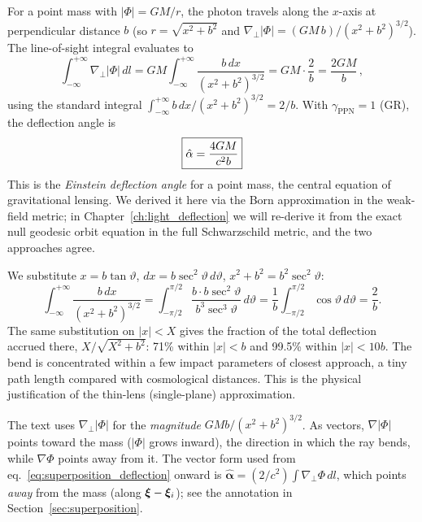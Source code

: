 For a point mass with $|\Phi| = GM/r$, the photon travels along the
$x$-axis at perpendicular distance $b$ (so
$r = \sqrt{x^2 + b^2}$ and
$\nabla_\perp |\Phi| = (GM\, b)/(x^2 + b^2)^{3/2}$).
The line-of-sight integral evaluates to
\begin{equation}
    \int_{-\infty}^{+\infty} \nabla_\perp |\Phi|\, dl
    = GM \int_{-\infty}^{+\infty}
    \frac{b\, dx}{(x^2 + b^2)^{3/2}}
    = GM \cdot \frac{2}{b}
    = \frac{2GM}{b} \,,
    \label{eq:deflection_integral_eval}
\end{equation}
using the standard integral
$\int_{-\infty}^{+\infty} b\, dx/(x^2 + b^2)^{3/2} = 2/b$.
With $\gamma_{\mathrm{PPN}} = 1$ (GR), the deflection angle is
\begin{equation}
    \boxed{
    \hat{\alpha} = \frac{4GM}{c^2 b}
    }
    \label{eq:deflection_point_mass}
\end{equation}
This is the \emph{Einstein deflection angle} for a point mass,
the central equation of gravitational lensing.  We derived
it here via the Born approximation in the weak-field metric; in
Chapter~\ref{ch:light_deflection} we will re-derive it from the exact null
geodesic orbit equation in the full Schwarzschild metric, and the two
approaches agree.

\begin{derivation}
We substitute $x = b\tan\vartheta$, $dx = b\sec^2\vartheta\,d\vartheta$,
$x^2 + b^2 = b^2\sec^2\vartheta$:
\[
\int_{-\infty}^{+\infty}\frac{b\,dx}{(x^2 + b^2)^{3/2}}
= \int_{-\pi/2}^{\pi/2}\frac{b\cdot b\sec^2\vartheta}{b^3\sec^3\vartheta}\,d\vartheta
= \frac1b\int_{-\pi/2}^{\pi/2}\cos\vartheta\,d\vartheta = \frac2b .
\]
The same substitution on $|x| < X$ gives the fraction of the total
deflection accrued there, $X/\sqrt{X^2 + b^2}$: 71\% within $|x| < b$ and
99.5\% within $|x| < 10b$.  The bend is concentrated within a few impact
parameters of closest approach, a tiny path length compared with
cosmological distances.  This is the physical justification of the thin-lens
(single-plane) approximation.
\end{derivation}

\begin{annotation}
The text uses $\nabla_\perp|\Phi|$ for the \emph{magnitude}
$GMb/(x^2 + b^2)^{3/2}$.  As vectors, $\nabla|\Phi|$ points toward the mass
($|\Phi|$ grows inward), the direction in which the ray bends, while
$\nabla\Phi$ points away from it.  The vector form used from
eq.~\eqref{eq:superposition_deflection} onward is
$\hat{\boldsymbol\alpha} = (2/c^2)\int\nabla_\perp\Phi\,dl$, which points
\emph{away} from the mass (along $\boldsymbol{\xi} - \boldsymbol{\xi}_i$); see the annotation in
Section~\ref{sec:superposition}.
\end{annotation}


